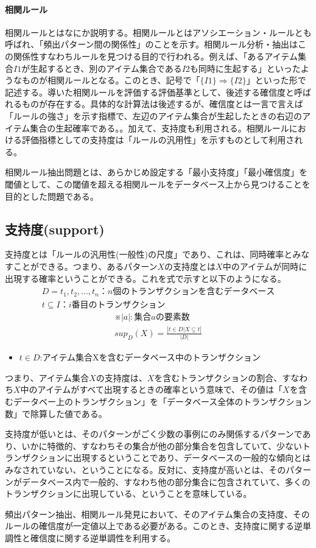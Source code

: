 \documentclass[dvipdfmx]{jsarticle}
\begin{document}
\paragraph{相関ルール}
相関ルールとはなにか説明する。相関ルールとはアソシエーション・ルールとも呼ばれ、「頻出パターン間の関係性」のことを示す。相関ルール分析・抽出はこの関係性すなわちルールを見つける目的で行われる。例えば、「あるアイテム集合$I1$が生起するとき、別のアイテム集合である$I2$も同時に生起する」といったようなものが相関ルールとなる。このとき、記号で「$\{I1\} \Rightarrow \{I2\}$」といった形で記述する。導いた相関ルールを評価する評価基準として、後述する確信度と呼ばれるものが存在する。具体的な計算法は後述するが、確信度とは一言で言えば「ルールの強さ」を示す指標で、左辺のアイテム集合が生起したときの右辺のアイテム集合の生起確率である。。加えて、支持度も利用される。相関ルールにおける評価指標としての支持度は「ルールの汎用性」を示すものとして利用される。\par
相関ルール抽出問題とは、あらかじめ設定する「最小支持度」「最小確信度」を閾値として、この閾値を超える相関ルールをデータベース上から見つけることを目的とした問題である。
\subsection{支持度(support)}
支持度とは「ルールの汎用性(一般性)の尺度」であり、これは、同時確率とみなすことができる。つまり、あるパターン$X$の支持度とは$X$中のアイテムが同時に出現する確率ということができる。これを式で示すと以下のようになる。
\begin{gather*}
  D = {t_{1}, t_{2},...,t_{n}}：n個のトランザクションを含むデータベース\\
  t \subseteq I：i番目のトランザクション
\end{gather*}
\begin{gather*}
  ※|a|:集合aの要素数\\
  sup_{D}(X) = \frac{|{t\in D|X\subseteq t}|}{|D|}
\end{gather*}
\begin{itemize}
  \item $t \in D$:アイテム集合Xを含むデータベース中のトランザクション
\end{itemize}
つまり、アイテム集合$X$の支持度は、$X$を含むトランザクションの割合、すなわち$X$中のアイテムがすべて出現するときの確率という意味で、その値は「$X$を含むデータベー上のトランザクション」を「データベース全体のトランザクション数」で除算した値である。\par
支持度が低いとは、そのパターンがごく少数の事例にのみ関係するパターンであり、いかに特徴的、すなわちその集合が他の部分集合を包含していて、少ないトランザクションに出現するということであり、データベースの一般的な傾向とはみなされていない、ということになる。反対に、支持度が高いとは、そのパターンがデータベース内で一般的、すなわち他の部分集合に包含されていて、多くのトランザクションに出現している、ということを意味している。\par
頻出パターン抽出、相関ルール発見において、そのアイテム集合の支持度、そのルールの確信度が一定値以上である必要がある。このとき、支持度に関する逆単調性と確信度に関する逆単調性を利用する。
\end{document}
